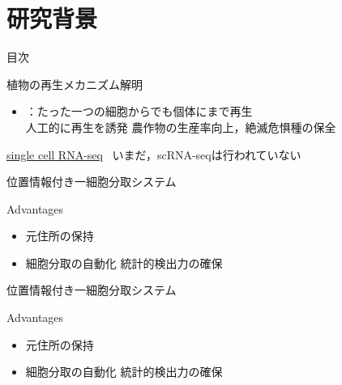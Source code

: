 \section{研究背景}

\begin{frame}[noframenumbering]{目次}
    \tableofcontents[currentsection]
\end{frame}

\begin{frame}{植物の再生メカニズム解明}
    \begin{itemize}
        \item {}：たった一つの細胞からでも個体にまで再生
        \\\ra 人工的に再生を誘発 \Ra 農作物の生産率向上，絶滅危惧種の保全
    \end{itemize}
    \vs
    \uline{single cell RNA-seq}\ \cite{kolodziejczyk2015technology}
    \Ra いまだ，scRNA-seqは行われていない
\end{frame}

\begin{frame}{位置情報付き一細胞分取システム}
    \begin{block}{Advantages}
        \begin{itemize}
            \item 元住所の保持 \Ra {}
            \item 細胞分取の自動化 \Ra 統計的検出力の確保
        \end{itemize}
    \end{block}
\end{frame}
\begin{frame}[noframenumbering]{位置情報付き一細胞分取システム}
    \begin{block}{Advantages}
        \begin{itemize}
            \item 元住所の保持 \Ra {}
            \item 細胞分取の自動化 \Ra 統計的検出力の確保
        \end{itemize}
    \end{block}
\end{frame}